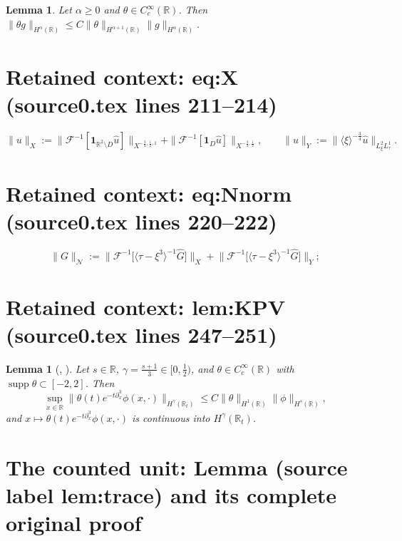 \documentclass[10pt,a4paper]{amsart}
\newcommand{\F}{\mathcal{F}}
\newcommand{\R}{\mathbb R}
\newcommand{\ga}{\gamma}
\newcommand{\lan}{\langle}
\newcommand{\pd}{\partial}
\newcommand{\ran}{\rangle}
\newcommand{\supp}{\operatorname{supp}}
\theoremstyle{plain}
\newtheorem{lemma}[theorem]{Lemma}
\theoremstyle{remark}
\begin{document}
\begin{lemma}\label{lem:cutoff}
Let $\alpha\ge0$ and $\theta\in C_c^\infty(\R)$. Then $\|\theta g\|_{H^\alpha(\R)}\le C\|\theta\|_{H^{\alpha+1}(\R)}\|g\|_{H^\alpha(\R)}$.
\end{lemma}


\section*{Retained context: eq:X (source0.tex lines 211--214)}

\begin{equation}\label{eq:X}
\|u\|_X := \| \mathcal{F}^{-1} [\mathbf{1}_{\mathbb{R}^2 \setminus D} \hat{u}] \|_{X^{-\frac{3}{4}, \frac{1}{2}, 1}} + \| \mathcal{F}^{-1} [\mathbf{1}_D \hat{u}] \|_{X^{-\frac{3}{4}, \frac{1}{2}}},\qquad
\|u\|_Y:=\|\lan\xi\ran^{-\frac34}\widehat u\|_{L^2_\xi L^1_\tau}.
\end{equation}


\section*{Retained context: eq:Nnorm (source0.tex lines 220--222)}

\begin{equation}\label{eq:Nnorm}
\|G\|_{\mathcal N}:=\big\|\F^{-1}\big[\lan\tau-\xi^3\ran^{-1}\widehat G\big]\big\|_X+\big\|\F^{-1}\big[\lan\tau-\xi^3\ran^{-1}\widehat G\big]\big\|_Y ;
\end{equation}


\section*{Retained context: lem:KPV (source0.tex lines 247--251)}

\begin{lemma}[\cite{KPV}, \cite{Holmer}]\label{lem:KPV}
Let $s\in\R$, $\ga=\frac{s+1}3\in[0,\frac12)$, and $\theta\in C_c^\infty(\R)$ with $\supp\theta\subset[-2,2]$. Then
$$\sup_{x\in\R}\|\theta(t)e^{-t\pd_x^3}\phi(x,\cdot)\|_{H^\ga(\R_t)}\le C\|\theta\|_{H^1(\R)}\|\phi\|_{H^s(\R)},$$
and $x\mapsto\theta(t)e^{-t\pd_x^3}\phi(x,\cdot)$ is continuous into $H^\ga(\R_t)$.
\end{lemma}


\section{The counted unit: Lemma (source label lem:trace) and its complete original proof}
\end{document}
